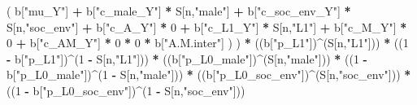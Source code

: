 \documentclass[
]{book}
\newenvironment{Shaded}{\begin{snugshade}}{\end{snugshade}}
\newcommand{\DecValTok}[1]{\textcolor[rgb]{0.00,0.00,0.81}{#1}}
\newcommand{\NormalTok}[1]{#1}
\newcommand{\SpecialCharTok}[1]{\textcolor[rgb]{0.81,0.36,0.00}{\textbf{#1}}}
\newcommand{\StringTok}[1]{\textcolor[rgb]{0.31,0.60,0.02}{#1}}
\begin{document}
\begin{Shaded}
\begin{Highlighting}[]
\NormalTok{                          ( b[}\StringTok{"mu\_Y"}\NormalTok{] }\SpecialCharTok{+} 
\NormalTok{                              b[}\StringTok{"c\_male\_Y"}\NormalTok{] }\SpecialCharTok{*}\NormalTok{ S[n,}\StringTok{"male"}\NormalTok{] }\SpecialCharTok{+} 
\NormalTok{                              b[}\StringTok{"c\_soc\_env\_Y"}\NormalTok{] }\SpecialCharTok{*}\NormalTok{ S[n,}\StringTok{"soc\_env"}\NormalTok{] }\SpecialCharTok{+} 
\NormalTok{                              b[}\StringTok{"c\_A\_Y"}\NormalTok{] }\SpecialCharTok{*} \DecValTok{0} \SpecialCharTok{+} 
\NormalTok{                              b[}\StringTok{"c\_L1\_Y"}\NormalTok{] }\SpecialCharTok{*}\NormalTok{ S[n,}\StringTok{"L1"}\NormalTok{] }\SpecialCharTok{+}
\NormalTok{                              b[}\StringTok{"c\_M\_Y"}\NormalTok{] }\SpecialCharTok{*} \DecValTok{0} \SpecialCharTok{+}
\NormalTok{                              b[}\StringTok{"c\_AM\_Y"}\NormalTok{] }\SpecialCharTok{*} \DecValTok{0} \SpecialCharTok{*} \DecValTok{0} \SpecialCharTok{*}\NormalTok{ b[}\StringTok{"A.M.inter"}\NormalTok{] ) ) }\SpecialCharTok{*}
\NormalTok{      ((b[}\StringTok{"p\_L1"}\NormalTok{])}\SpecialCharTok{\^{}}\NormalTok{(S[n,}\StringTok{"L1"}\NormalTok{])) }\SpecialCharTok{*}
\NormalTok{      ((}\DecValTok{1} \SpecialCharTok{{-}}\NormalTok{ b[}\StringTok{"p\_L1"}\NormalTok{])}\SpecialCharTok{\^{}}\NormalTok{(}\DecValTok{1} \SpecialCharTok{{-}}\NormalTok{ S[n,}\StringTok{"L1"}\NormalTok{])) }\SpecialCharTok{*}
\NormalTok{      ((b[}\StringTok{"p\_L0\_male"}\NormalTok{])}\SpecialCharTok{\^{}}\NormalTok{(S[n,}\StringTok{"male"}\NormalTok{])) }\SpecialCharTok{*} 
\NormalTok{      ((}\DecValTok{1} \SpecialCharTok{{-}}\NormalTok{ b[}\StringTok{"p\_L0\_male"}\NormalTok{])}\SpecialCharTok{\^{}}\NormalTok{(}\DecValTok{1} \SpecialCharTok{{-}}\NormalTok{ S[n,}\StringTok{"male"}\NormalTok{])) }\SpecialCharTok{*} 
\NormalTok{      ((b[}\StringTok{"p\_L0\_soc\_env"}\NormalTok{])}\SpecialCharTok{\^{}}\NormalTok{(S[n,}\StringTok{"soc\_env"}\NormalTok{])) }\SpecialCharTok{*}
\NormalTok{      ((}\DecValTok{1} \SpecialCharTok{{-}}\NormalTok{ b[}\StringTok{"p\_L0\_soc\_env"}\NormalTok{])}\SpecialCharTok{\^{}}\NormalTok{(}\DecValTok{1} \SpecialCharTok{{-}}\NormalTok{ S[n,}\StringTok{"soc\_env"}\NormalTok{])) }
    

\end{Highlighting}
\end{Shaded}
\end{document}
